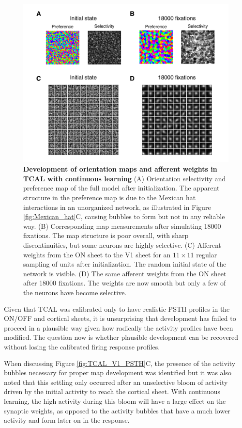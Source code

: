 \documentclass[phd,ianc,twoside]{infthesis}
\begin{document}
\begin{figure}
\center
\includegraphics[width=1.1\textwidth]{./figures/TCAL_OR_No_Snapshot.pdf}
\caption{{\bf Development of orientation maps and afferent weights in
    TCAL with continuous learning} (A) Orientation selectivity
  and preference map of the full model after initialization. The
  apparent structure in the preference map is due to the Mexican hat interactions
  in an unorganized network, as illustrated in Figure
  \ref{fig:Mexican_hat}C, causing bubbles to form but not in any
  reliable way.  (B) Corresponding map measurements after
  simulating 18000 fixations. The map structure is poor overall, with sharp
  discontinuities, but some neurons are highly selective. (C)
  Afferent weights from the ON sheet to the V1 sheet for an $11\times11$
  regular sampling of units after initialization. The random initial
  state of the network is visible. (D) The same afferent weights from
  the ON sheet after 18000 fixations. The weights are now smooth but
  only a few of the neurons have become selective.}
\label{fig:TCAL_No_Snapshot}
\end{figure}

Given that TCAL was calibrated only to have realistic PSTH profiles in the
ON/OFF and cortical sheets, it is unsurprising that development has
failed to proceed in a plausible way given how radically the activity profiles
have been modified. The question now is whether plausible
development can be recovered without losing the calibrated firing
response profiles.

When discussing Figure \ref{fig:TCAL_V1_PSTH}C, the presence of the
activity bubbles necessary for proper map development was identified but
it was also noted that this settling only occurred after an unselective
bloom of activity driven by the initial activity to reach the cortical
sheet. With continuous learning, the high activity during this bloom
will have a large effect on the synaptic weights, as opposed to the
activity bubbles that have a much lower activity and form later on in
the response.
\end{document}
